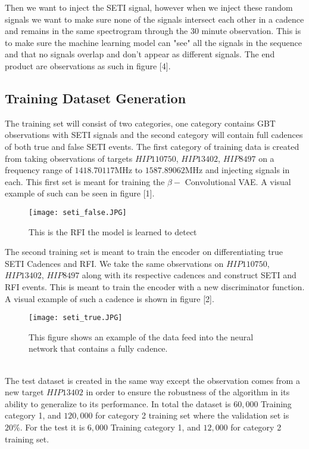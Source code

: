 \documentclass{article}
\begin{document}
Then we want to inject the SETI signal, however when we inject these random signals we want to make sure none of the signals intersect each other in a cadence and remains in the same spectrogram through the 30 minute observation. This is to make sure the machine learning model can "see" all the signals in the sequence and that no signals overlap and don't appear as different signals. The end product 
are observations as such in figure [4]. 

\subsection{Training Dataset Generation}
The training set will consist of two categories, one category contains GBT observations with SETI signals and the second category will contain full cadences of both true and false SETI events. The first category of training data is created from taking observations of targets ${HIP110750}$, $HIP13402$, $HIP8497$ on a frequency range of $1418.70117$MHz to $1587.89062$MHz and injecting signals in each. This first set is meant for training the $\beta-$ Convolutional VAE. A visual example of such can be seen in figure [1]. 

\begin{figure}[h]
\texttt{[image: seti\_false.JPG]}
\centering
\caption{This is the RFI the model is learned to detect}
\end{figure}

The second training set is meant to train the encoder on differentiating true SETI Cadences and RFI. We take the same observations on ${HIP110750}$, $HIP13402$, $HIP8497$ along with its respective cadences and construct SETI and RFI events. This is meant to train the encoder with a new discriminator function. A visual example of such a cadence is shown in figure [2].

\begin{figure}[h]
\texttt{[image: seti\_true.JPG]}
\centering
\caption{This figure shows an example of the data feed into the neural network that contains a fully cadence. }
\end{figure}

\\
The test dataset is created in the same way except the observation comes from a new target ${HIP13402}$ in order to ensure the robustness of the algorithm in its ability to generalize to its performance. In total the dataset is $60,000$ Training category 1, and $120,000$ for category 2 training set where the validation set is $20\%$. For the test it is $6,000$ Training category 1, and $12,000$ for category 2 training set.\\
\end{document}
